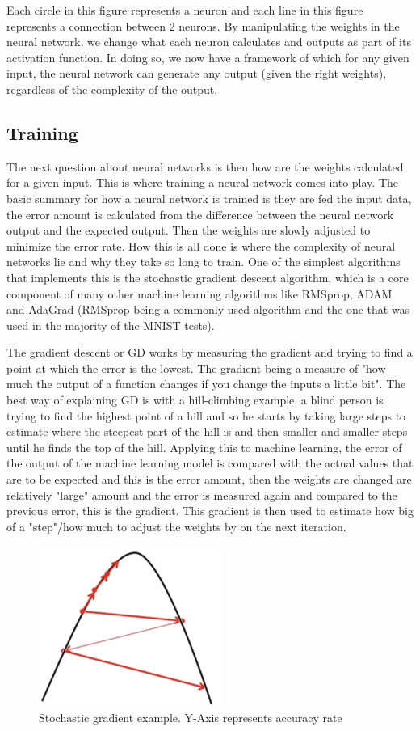 \documentclass[a4paper,oneside,phd,etd]{BYUPhys}
\begin{document}
Each circle in this figure represents a neuron and each line in this figure represents a connection between 2 neurons. By manipulating the weights in the neural network, we change what each neuron calculates and outputs as part of its activation function. In doing so, we now have a framework of which for any given input, the neural network can generate any output (given the right weights), regardless of the complexity of the output\cite{nielsen}. 

\subsection{Training}
The next question about neural networks is then how are the weights calculated for a given input. This is where training a neural network comes into play. The basic summary for how a neural network is trained is they are fed the input data, the error amount is calculated from the difference between the neural network output and the expected output. Then the weights are slowly adjusted to minimize the error rate. How this is all done is where the complexity of neural networks lie and why they take so long to train. One of the simplest algorithms that implements this is the stochastic gradient descent algorithm, which is a core component of many other machine learning algorithms like RMSprop, ADAM and AdaGrad (RMSprop being a commonly used algorithm and the one that was used in the majority of the MNIST tests). 

The gradient descent or GD works by measuring the gradient and trying to find a point at which the error is the lowest. The gradient being a measure of "how much the output of a function changes if you change the inputs a little bit"\cite{towards-data-science}.
The best way of explaining GD is with a hill-climbing example, a blind person is trying to find the highest point of a hill and so he starts by taking large steps to estimate where the steepest part of the hill is and then smaller and smaller steps until he finds the top of the hill. Applying this to machine learning, the error of the output of the machine learning model is compared with the actual values that are to be expected and this is the error amount, then the weights are changed are relatively "large" amount and the error is measured again and compared to the previous error, this is the gradient. This gradient is then used to estimate how big of a "step"/how much to adjust the weights by on the next iteration.
\begin{figure}[H]
\centering
\includegraphics[width=6cm]{pictures/gradient.png}
\caption{Stochastic gradient example.
Y-Axis represents accuracy rate}
\label{fig:gradient}
\end{figure}
\end{document}
